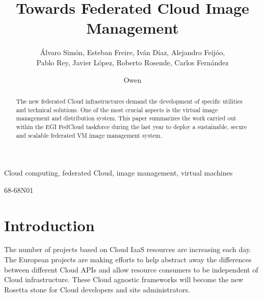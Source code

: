 \documentclass{cai}
\begin{document}
\label{firstpage}

\title[Towards Federated Cloud Image Management]
      {Towards Federated Cloud Image Management}

\author[A. Sim\'on, E. Freire, I. D\'iaz, R. Rosende]
       {\'Alvaro Sim\'on, Esteban Freire, Iv\'an D\'iaz, Alejandro Feij\'oo, \\
Pablo Rey, Javier L\'opez, Roberto Rosende, Carlos Fern\'andez}



\author[O. Synge et al.]
       {Owen }




\noreceived{} \nocommunicated{}

\maketitle

\begin{abstract}
The new federated Cloud infrastructures demand the development of specific utilities and technical solutions. One of the most crucial aspects is the virtual image management and distribution system.
This paper summarizes the work carried out within the EGI FedCloud taskforce during the last year to deploy a sustainable, secure and scalable federated VM image management system.
\end{abstract}

\begin{keywords}
Cloud computing, federated Cloud, image management, virtual machines
\end{keywords}

\begin{mathclass}
68-68N01
\end{mathclass}


\section{Introduction}
\label{sect-introduction}
The number of projects based on Cloud IaaS resources are increasing each day. The European projects are making efforts to help abstract away the differences between different Cloud APIs and allow resource consumers to be independent of Cloud infrastructure.
These Cloud agnostic frameworks will become the new Rosetta stone for Cloud developers and site administrators. 
\end{document}
